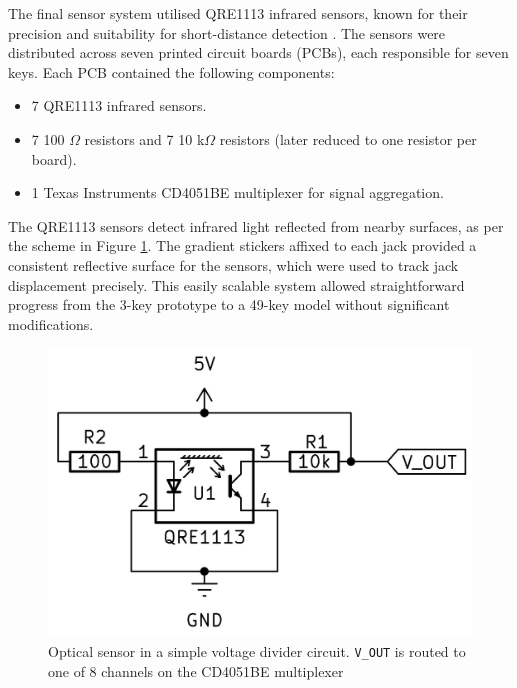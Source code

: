 The final sensor system utilised QRE1113 infrared sensors, known for their precision and suitability for short-distance detection \cite{McPherson2013, McPherson2019}. The sensors were distributed across seven printed circuit boards (PCBs), each responsible for seven keys. Each PCB contained the following components:

\begin{itemize}
    \item 7 QRE1113 infrared sensors.
    \item 7 100 $\Omega$ resistors and 7 10 k$\Omega$ resistors (later reduced to one resistor per board).
    \item 1 Texas Instruments CD4051BE multiplexer for signal aggregation.
\end{itemize}

The QRE1113 sensors detect infrared light reflected from nearby surfaces, as per the scheme in Figure \ref{fig:simple-schematic}. The gradient stickers affixed to each jack provided a consistent reflective surface for the sensors, which were used to track jack displacement precisely. This easily scalable system allowed straightforward progress from the 3-key prototype to a 49-key model without significant modifications.

\begin{figure}[b]  
  \centering
  \includegraphics[width=\linewidth]{src/images/simple-schematic-bw-.jpg} 
  \caption{Optical sensor in a simple voltage divider circuit. \texttt{V\_OUT} is routed to one of 8 channels on the CD4051BE multiplexer}
  \Description{} 
  \label{fig:simple-schematic}
\end{figure}




